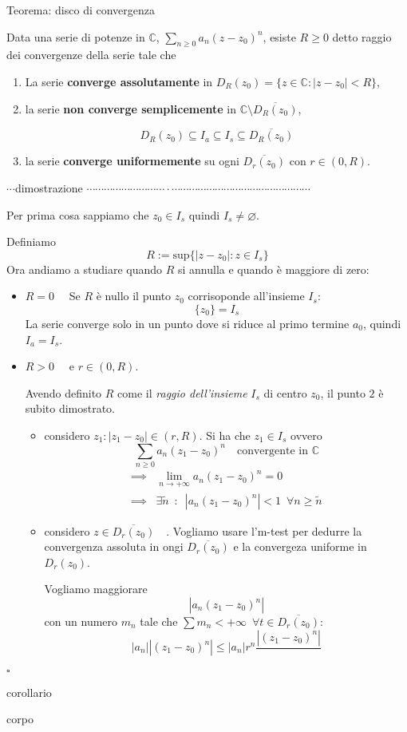 \documentclass[x11names]{article}
\newcommand*{\QEDB}{\null\nobreak\hfill\ensuremath{\square}}%
\newcommand{\teorema}[2]{
	\begin{center}
		\fboxsep11pt
		\colorbox{myred}{\begin{minipage}{5.75in}
				\begin{redes}{#1}
					#2
				\end{redes}
		\end{minipage}}
	\end{center}
}
\newcommand{\dimostrazione}[2]{
	\begin{dym}{\(\cdots\)dimostrazione#1 \(\cdots \cdots \cdots \cdots \cdots \cdots \cdots \cdots \cdots\cdot\cdots\cdots\cdots\cdots\cdots\cdots\cdots\cdots\cdots\cdots\cdots\cdots\cdots\cdots\cdots\cdots\)}
		#2
		\QEDB
	\end{dym}
}
\newcommand{\corollario}[2]{
	\begin{center}
		\begin{coroll}{corollario#1}
			#2
		\end{coroll}
	\end{center}
}
\begin{document}
\teorema{Teorema: disco di convergenza}{
Data una serie di potenze in \(\mathbb{C}\), \(\sum_{n\geq 0} a_{n}(z- z_{0})^n\), esiste \(R\geq 0\) detto raggio dei convergenze della serie tale che
\begin{enumerate}
	\item La serie \textbf{converge assolutamente} in \(D_{R}(z_{0}) = \{z\in \mathbb{C} : |z-z_{0}| < R\}\),
	\item la serie \textbf{non converge semplicemente} in \(\mathbb{C} \setminus \overline{D_{R}(z_{0})}\),
	
	\[ 
	D_{R}(z_{0}) \subseteq I_{a} \subseteq I_{s} \subseteq \overline{D_{R}(z_{0})}
	\]
	
	\item la serie \textbf{converge uniformemente} su ogni \(\overline{D_{r}(z_{0})}\) con \(r \in (0,R)\).
\end{enumerate}
}
\dimostrazione{}{
Per prima cosa sappiamo che \(z_{0} \in I_{s}\) quindi \(I_{s} \neq \varnothing\).

Definiamo 
\[ 
R := \text{sup}\{|z-z_{0}| : z \in I_{s}\}
\]
Ora andiamo a studiare quando \(R\) si annulla e quando è maggiore di zero:
\begin{itemize}
	\item \(\boxed{R = 0} \quad\) Se \(R\) è nullo il punto \(z_{0}\) corrisoponde all'insieme \(I_{s}\): 
	\[ 
	\{z_{0}\} = I_{s}
	\]
	La serie converge solo in un punto dove si riduce al primo termine \(a_{0}\), quindi \(I_{a} = I_{s}\).
	\item \(\boxed{R > 0} \quad\) e \(r \in (0,R)\).
	
	Avendo definito \(R\) come il \textit{raggio dell'insieme} \(I_{s}\) di centro \(z_{0}\), il punto \(2\) è subito dimostrato.
	
	\begin{itemize}
		\item considero \(\boxed{z_{1}:|z_{1} - z_{0}| \in (r,R)}\). Si ha che \(z_{1} \in I_{s}\) ovvero
		\[ 
		\sum_{n\geq 0} a_{n}(z_{1}-z_{0})^n \quad \text{convergente in } \mathbb{C}
		\]
		\begin{align*}
			\implies& \lim_{n\to +\infty}a_{n}(z_{1}-z_{0})^n = 0 \\ 
			\implies& \exists\tilde{n} \;\ : \;\ |a_{n}(z_{1}-z_{0})^n| < 1 \;\ \forall n \geq \tilde{n}
		\end{align*}
		
		\item considero \(\boxed{z \in \overline{D_{r}(z_{0})}} \quad\). Vogliamo usare l'm-test per dedurre la convergenza assoluta in ongi \(\overline{D_{r}(z_{0})}\) e la convergeza uniforme in \(D_{r}(z_{0})\).
		
		Vogliamo maggiorare
		\[ 
		|a_{n}(z_{1}-z_{0})^n|
		\]
		con un numero \(m_{n}\) tale che \(\sum m_{n} < +\infty \;\ \forall t \in \overline{D_{r}(z_{0})}\):
		\[ 
		|a_{n}||(z_{1}-z_{0})^n| \leq |a_{n}|r^n\frac{|(z_{1}-z_{0})^n|}{}
		\]
	\end{itemize}
\end{itemize}
}
\corollario{}{
corpo
}
	
\end{document}
